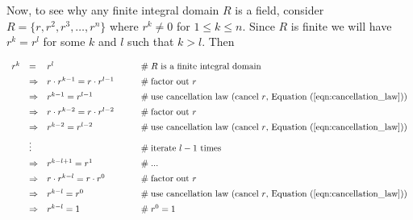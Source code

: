 \documentclass{article}
\theoremstyle{definition}
\begin{document}
\medskip
\noindent
Now, to see why any finite integral domain $R$ is a field, consider 
$R = \{r, r^2, r^3, \hdots, r^n\}$ where $r^k \neq 0$ for $1 \leq k
\leq n$.  Since $R$ is finite we will have $r^k = r^l$ for some
$k$ and $l$ such that $k > l$. Then

\bigskip
\begin{equation*}
\begin{array}{rlll} 
r^k 
&=& r^l                                                 
			&\hspace{2em} \mathrel{\#} \text{$R$ is a finite integral domain} \\
[5pt]
&\Rightarrow& r \cdot r^{k-1} = r \cdot r^{l -1}        
			&\hspace{2em} \mathrel{\#} \text{factor out $r$} \\
[5pt]
&\Rightarrow& r^{k-1} = r^{l -1}                        
			&\hspace{2em}\mathrel{\#} \text{use cancellation law (cancel $r$, 
				Equation (\ref{eqn:cancellation_law})}) \\
[5pt]
&\Rightarrow& r \cdot r^{k-2} = r \cdot r^{l -2}        
			&\hspace{2em}\mathrel{\#} \text{factor out $r$} \\
[5pt]
&\Rightarrow& r^{k-2} = r^{l -2}                        
			&\hspace{2em}\mathrel{\#} \text{use cancellation law (cancel $r$, 
				Equation (\ref{eqn:cancellation_law}))} \\
[5pt]
&\vdots                                                 
			&&\hspace{2em}\mathrel{\#} \text{iterate $l - 1$ times} \\ 
[5pt]   
&\Rightarrow& r^{k - l + 1} = r^1                       
			&\hspace{2em}\mathrel{\#} \text{...} \\ 
[5pt]      
&\Rightarrow& r \cdot r^{k - l} = r \cdot r^0           
			&\hspace{2em}\mathrel{\#} \text{factor out $r$} \\
[5pt] 
&\Rightarrow& r^{k-l} = r^{0}                           
			&\hspace{2em}\mathrel{\#} \text{use cancellation law (cancel $r$, 
				Equation (\ref{eqn:cancellation_law}))} \\
[5pt]
&\Rightarrow& r^{k-l} = 1                               
			&\hspace{2em}\mathrel{\#} r^0 = 1
\end{array}
\end{equation*}
\end{document}
